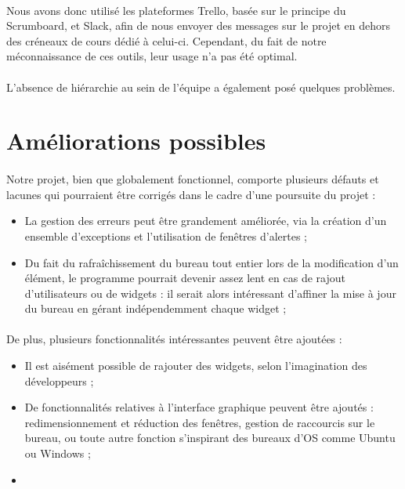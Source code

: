 \paragraph{}
Nous avons donc utilisé les plateformes Trello, basée sur le principe du Scrumboard, et Slack, afin de nous envoyer des messages sur le projet en dehors des créneaux de cours dédié à celui-ci. Cependant, du fait de notre méconnaissance de ces outils, leur usage n'a pas été optimal.

\paragraph{}
L'absence de hiérarchie au sein de l'équipe a également posé quelques problèmes.

\section{Améliorations possibles}

\paragraph{}
Notre projet, bien que globalement fonctionnel, comporte plusieurs défauts et lacunes qui pourraient être corrigés dans le cadre d'une poursuite du projet :
\begin{itemize}
	\item La gestion des erreurs peut être grandement améliorée, via la création d'un ensemble d'exceptions et l'utilisation de fenêtres d'alertes ;
	\item Du fait du rafraîchissement du bureau tout entier lors de la modification d'un élément, le programme pourrait devenir assez lent en cas de rajout d'utilisateurs ou de widgets : il serait alors intéressant d'affiner la mise à jour du bureau en gérant indépendemment chaque widget ;
\end{itemize}

\paragraph{}
De plus, plusieurs fonctionnalités intéressantes peuvent être ajoutées :
\begin{itemize}
	\item Il est aisément possible de rajouter des widgets, selon l'imagination des développeurs ;
	\item De fonctionnalités relatives à l'interface graphique peuvent être ajoutés : redimensionnement et réduction des fenêtres, gestion de raccourcis sur le bureau, ou toute autre fonction s'inspirant des bureaux d'OS comme Ubuntu ou Windows ;
	\item 
\end{itemize}


